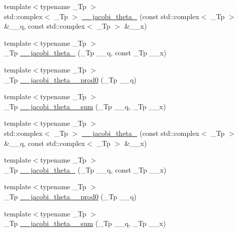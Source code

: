 \begin{DoxyCompactItemize}
\item 
{\footnotesize template$<$typename \+\_\+\+Tp $>$ }\\std\+::complex$<$ \+\_\+\+Tp $>$ \hyperlink{namespacestd_1_1____detail_a78ac45872aa909886eebeef2ff29bf3d}{\+\_\+\+\_\+jacobi\+\_\+theta\+\_} (const std\+::complex$<$ \+\_\+\+Tp $>$ \&\+\_\+\+\_\+q, const std\+::complex$<$ \+\_\+\+Tp $>$ \&\+\_\+\+\_\+x)
\item 
{\footnotesize template$<$typename \+\_\+\+Tp $>$ }\\\+\_\+\+Tp \hyperlink{namespacestd_1_1____detail_a5aace3bea7c88443d5bceb503a0452d0}{\+\_\+\+\_\+jacobi\+\_\+theta\+\_} (\+\_\+\+Tp \+\_\+\+\_\+q, const \+\_\+\+Tp \+\_\+\+\_\+x)
\item 
{\footnotesize template$<$typename \+\_\+\+Tp $>$ }\\\+\_\+\+Tp \hyperlink{namespacestd_1_1____detail_a83ede07a0108c30b3fd6f8e59b7bd7d2}{\+\_\+\+\_\+jacobi\+\_\+theta\+\_\+\_\+prod0} (\+\_\+\+Tp \+\_\+\+\_\+q)
\item 
{\footnotesize template$<$typename \+\_\+\+Tp $>$ }\\\+\_\+\+Tp \hyperlink{namespacestd_1_1____detail_a6eba88f5f854974b7fe7445e9b11a0e0}{\+\_\+\+\_\+jacobi\+\_\+theta\+\_\+\_\+sum} (\+\_\+\+Tp \+\_\+\+\_\+q, \+\_\+\+Tp \+\_\+\+\_\+x)
\item 
{\footnotesize template$<$typename \+\_\+\+Tp $>$ }\\std\+::complex$<$ \+\_\+\+Tp $>$ \hyperlink{namespacestd_1_1____detail_aef309a6de7d2ebab3ee1fcd87dbe6b48}{\+\_\+\+\_\+jacobi\+\_\+theta\+\_} (const std\+::complex$<$ \+\_\+\+Tp $>$ \&\+\_\+\+\_\+q, const std\+::complex$<$ \+\_\+\+Tp $>$ \&\+\_\+\+\_\+x)
\item 
{\footnotesize template$<$typename \+\_\+\+Tp $>$ }\\\+\_\+\+Tp \hyperlink{namespacestd_1_1____detail_a6a7102085368188062ef47100ce80239}{\+\_\+\+\_\+jacobi\+\_\+theta\+\_} (\+\_\+\+Tp \+\_\+\+\_\+q, const \+\_\+\+Tp \+\_\+\+\_\+x)
\item 
{\footnotesize template$<$typename \+\_\+\+Tp $>$ }\\\+\_\+\+Tp \hyperlink{namespacestd_1_1____detail_aa9e35fac0b9a6449071343520eab552c}{\+\_\+\+\_\+jacobi\+\_\+theta\+\_\+\_\+prod0} (\+\_\+\+Tp \+\_\+\+\_\+q)
\item 
{\footnotesize template$<$typename \+\_\+\+Tp $>$ }\\\+\_\+\+Tp \hyperlink{namespacestd_1_1____detail_a07e080795e7f80c5a0b733d6bac49675}{\+\_\+\+\_\+jacobi\+\_\+theta\+\_\+\_\+sum} (\+\_\+\+Tp \+\_\+\+\_\+q, \+\_\+\+Tp \+\_\+\+\_\+x)

\end{DoxyCompactItemize}

